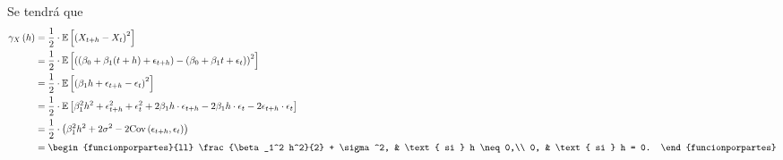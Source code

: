 \documentclass[../main.tex]{subfiles}
\begin{document}
    \begin{demostracion}
    	Se tendrá que
            \begin{align*}
            	\f {\gamma_X} h &= \frac 1 2 \cdot \Esp{\pare{X_{t+h} - X_t}^2}\\
            	&= \frac 1 2 \cdot \Esp{\pare{(\beta_0 + \beta_1 (t+h) + \epsilon_{t+h}) - (\beta_0 + \beta_1 t + \epsilon_t)}^2}\\
            	&= \frac 1 2 \cdot \Esp{\pare{\beta_1 h + \epsilon_{t+h} - \epsilon_t}^2}\\
            	&= \frac 1 2 \cdot \Esp{\beta_1^2 h^2 + \epsilon^2_{t+h} + \epsilon^2_t + 2\beta_1 h \cdot \epsilon_{t+h} - 2\beta_1 h \cdot \epsilon_t - 2\epsilon_{t+h} \cdot \epsilon_{t}}\\
            	&= \frac 1 2 \cdot \pare{\beta_1^2 h^2 + 2 \sigma^2 - 2 \Cov{\epsilon_{t+h},\epsilon_t}}\\
            	&= \begin{funcionporpartes}{ll}
                        \frac{\beta_1^2 h^2}{2} + \sigma^2, & \text{ si } h \neq 0,\\
                        0, & \text{ si } h = 0.
            	   \end{funcionporpartes}
            \end{align*}

    \end{demostracion}
\end{document}
